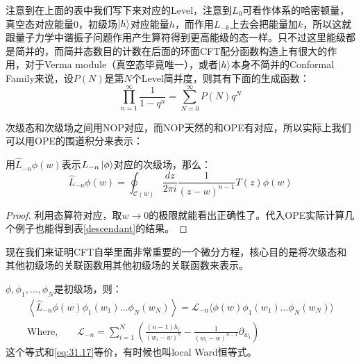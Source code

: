 注意到在上面的表中我们写下来对应的Level，注意到$L_0$可看作体系的哈密顿量，真空态对应能量0，初级场$\ket{h}$对应能量$h$，而作用$L_{-k}$上去会把能量加$k$，所以这就跟量子力学中谐振子问题作用产生算符得到更高能级的态一样。只不过这里能级都是简并的，而简并态数目的计数在后面的环面CFT配分函数构造上有很大的作用，对于Verma module（真空态毕竟唯一），或者$\ket{h}$本身不简并的Conformal Family来说，设$P(N)$是第$N$个Level简并度，则其有下面的生成函数：
\begin{equation}
	\boxed{
		\prod_{n=1}^\infty\frac1{1-q^n}=\sum_{N=0}^\infty P(N)q^N
	}
\end{equation}

次级态和次级场之间用NOP对应，而NOP天然的和OPE有对应，所以实际上我们可以用OPE的围道积分来表示：
\begin{theorem}
	用$\widehat{L}_{-n}\phi(w)$表示$L_{-n}\ket\phi$对应的次级场，那么：
	\begin{equation}\label{eq:33.30}
		\boxed{
			\widehat{L}_{-n}\phi(w)=\oint_{\mathcal{C}(w)}\frac{dz}{2\pi i}\frac1{(z-w)^{n-1}}T(z)\phi(w)
		}
	\end{equation}
\end{theorem}
\begin{proof}
	利用态算符对应，取$w\to 0$的极限就能看出正确性了。代入OPE实际计算几个例子也能得到表\ref{descendant}的结果。
\end{proof}
现在我们来证明CFT自举里面非常重要的一个微分方程，核心目的是将次级态和其他初级场的关联函数用其他初级场的关联函数来表示。
\begin{theorem}
	$\phi,\phi_1,\ldots,\phi_N$是初级场，则：
	\begin{equation}\label{33.31}
		\boxed{
			\begin{gathered}
				\left\langle\widehat{L}_{-n}\phi(w)\phi_{1}(w_{1})\ldots\phi_{N}(w_{N})\right\rangle=\mathcal{L}_{-n}\langle\phi(w)\phi_{1}(w_{1})\ldots\phi_{N}(w_{N})\rangle  \\
				\text{Where,}\qquad\mathcal{L}_{-n}=\sum_{i=1}^N\left(\frac{(n-1)h_i}{(w_i-w)^n}-\frac1{(w_i-w)^{n-1}}\partial_{w_i}\right)
			\end{gathered}
		}
	\end{equation}
	这个等式和\ref{eq:31.17}等价，有时候也叫local Ward恒等式。
\end{theorem}

